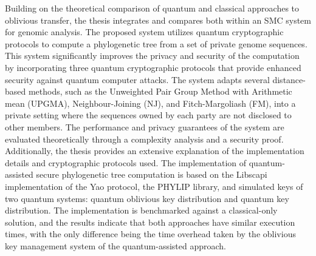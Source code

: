 Building on the theoretical comparison of quantum and classical approaches to oblivious transfer, the thesis integrates and compares both within an SMC system for genomic analysis. The proposed system utilizes quantum cryptographic protocols to compute a phylogenetic tree from a set of private genome sequences. This system significantly improves the privacy and security of the computation by incorporating three quantum cryptographic protocols that provide enhanced security against quantum computer attacks. The system adapts several distance-based methods, such as the Unweighted Pair Group Method with Arithmetic mean (UPGMA), Neighbour-Joining (NJ), and Fitch-Margoliash (FM), into a private setting where the sequences owned by each party are not disclosed to other members. The performance and privacy guarantees of the system are evaluated theoretically through a complexity analysis and a security proof. Additionally, the thesis provides an extensive explanation of the implementation details and cryptographic protocols used. The implementation of quantum-assisted secure phylogenetic tree computation is based on the Libscapi implementation of the Yao protocol, the PHYLIP library, and simulated keys of two quantum systems: quantum oblivious key distribution and quantum key distribution. The implementation is benchmarked against a classical-only solution, and the results indicate that both approaches have similar execution times, with the only difference being the time overhead taken by the oblivious key management system of the quantum-assisted approach.

